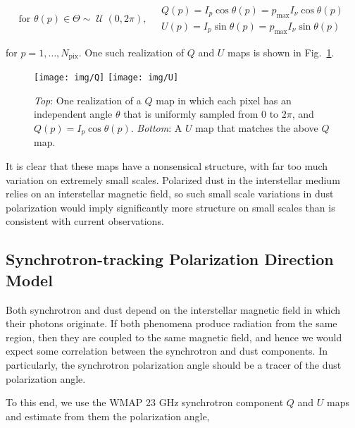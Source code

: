 \documentclass[twoside,10pt]{article}
\DeclareMathOperator{\Uniform}{\mathcal{U}}
\begin{document}
\begin{equation}
    \text{for } \theta(p) \in \Theta \sim \Uniform{(0, 2\pi)}, \quad
    \begin{array}{l}
        Q(p) = I_p \cos{\theta(p)} = p_\mathrm{max} I_\nu \cos{\theta(p)}\\
        U(p) = I_p \sin{\theta(p)} = p_\mathrm{max} I_\nu \sin{\theta(p)}
    \end{array}
\end{equation}

for $p = 1, \dots, N_\mathrm{pix}$. One such realization of $Q$ and $U$ maps
is shown in Fig.~\ref{fig:QU}.

\begin{figure}[th]
    \begin{center}
        \texttt{[image: img/Q]}
        \texttt{[image: img/U]}
    \end{center}
    \caption{\emph{Top}: One realization of a $Q$ map in which each pixel has
    an independent angle $\theta$ that is uniformly sampled from 0 to $2\pi$,
    and $Q(p) = I_p \cos{\theta(p)}$. \emph{Bottom}: A $U$ map that matches
    the above $Q$ map.}
    \label{fig:QU}
\end{figure}

It is clear that these maps have a nonsensical structure, with far too much
variation on extremely small scales. Polarized dust in the interstellar medium
relies on an interstellar magnetic field\cite{lazarian_tracing_2007}, so such
small scale variations in dust polarization would imply significantly more
structure on small scales than is consistent with current observations.

\subsection{Synchrotron-tracking Polarization Direction Model}
\label{sub:synchrotron_tracking_model}

Both synchrotron\cite{rybicki_radiative_1985} and
dust\cite{lazarian_tracing_2007} depend on the interstellar magnetic field in
which their photons originate. If both phenomena produce radiation from the
same region, then they are coupled to the same magnetic field, and hence we
would expect some correlation between the synchrotron and dust components. In
particularly, the synchrotron polarization angle should be a tracer of the
dust polarization angle\cite{delabrouille_pre-launch_2013}.

To this end, we use the WMAP 23 GHz synchrotron component $Q$ and $U$ maps
and estimate from them the polarization angle,
\end{document}
